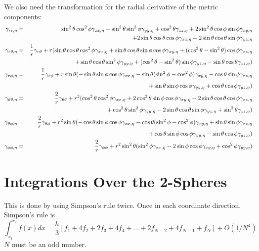 \documentclass{article}
\begin{document}
We also need 
the transformation for the radial derivative of the metric components:
\begin{eqnarray*}
\gamma_{rr,\eta}&=&
\sin^2\theta\cos^2\phi\gamma_{xx,\eta}
+\sin^2\theta\sin^2\phi\gamma_{yy,\eta}
+\cos^2\theta\gamma_{zz,\eta}
+2\sin^2\theta\cos\phi\sin\phi\gamma_{xy,\eta}
\\
&&
+2\sin\theta\cos\theta\cos\phi\gamma_{xz,\eta}
+2\sin\theta\cos\theta\sin\phi\gamma_{yz,\eta}
\\
\gamma_{r\theta,\eta}&=& 
\frac{1}{r}\gamma_{r\theta}+
r(\sin\theta\cos\theta\cos^2\phi\gamma_{xx,\eta}
+\sin\theta\cos\theta\sin\phi\cos\phi\gamma_{xy,\eta}
+(\cos^2\theta-\sin^2\theta)\cos\phi\gamma_{xz,\eta}
\\
&&
+\sin\theta\cos\theta\sin^2\phi\gamma_{yy,\eta}
+(\cos^2\theta-\sin^2\theta)\sin\phi\gamma_{yz,\eta}
-\sin\theta\cos\theta\gamma_{zz,\eta})
\\
\gamma_{r\phi,\eta}&=&
\frac{1}{r}\gamma_{r\phi}+
r\sin\theta(-\sin\theta\sin\phi\cos\phi\gamma_{xx,\eta}
-\sin\theta(\sin^2\phi-\cos^2\phi)\gamma_{xy,\eta}
-\cos\theta\sin\phi\gamma_{xz,\eta}
\\
&&
+\sin\theta\sin\phi\cos\phi\gamma_{yy,\eta}
+\cos\theta\cos\phi\gamma_{yz,\eta})
\\
\gamma_{\theta\theta,\eta}&=&
\frac{2}{r}\gamma_{\theta\theta}+
r^2(\cos^2\theta\cos^2\phi\gamma_{xx,\eta}
+2\cos^2\theta\sin\phi\cos\phi\gamma_{xy,\eta}
-2\sin\theta\cos\theta\cos\phi\gamma_{xz,\eta}
\\
&&
+\cos^2\theta\sin^2\phi\gamma_{yy,\eta}
-2\sin\theta\cos\theta\sin\phi\gamma_{yz,\eta}
+\sin^2\theta\gamma_{zz,\eta})
\\
\gamma_{\theta\phi,\eta}&=&
\frac{2}{r}\gamma_{\theta\phi}+
r^2\sin\theta(-\cos\theta\sin\phi\cos\phi\gamma_{xx,\eta}
-\cos\theta(\sin^2\phi-\cos^2\phi)\gamma_{xy,\eta}
+\sin\theta\sin\phi\gamma_{xz,\eta}
\\
&&
+\cos\theta\sin\phi\cos\phi\gamma_{yy,\eta}
-\sin\theta\cos\phi\gamma_{yz,\eta})
\\
\gamma_{\phi\phi,\eta}&=&
\frac{2}{r}\gamma_{\phi\phi}+
r^2\sin^2\theta(\sin^2\phi\gamma_{xx,\eta}
-2\sin\phi\cos\phi\gamma_{xy,\eta}
+\cos^2\phi\gamma_{yy,\eta})
\end{eqnarray*}

\section{Integrations Over the 2-Spheres}


This is done by using Simpson's rule twice. Once in each coordinate 
direction. Simpson's rule is
\begin{equation}
\int^{x_2}_{x_1} f(x) dx = 
  \frac{h}{3} [f_1+4f_2+2f_3+4f_4+\ldots+2f_{N-2}+4 f_{N-1}+f_N]
  +O(1/N^4)
\end{equation}
$N$ must be an odd number.
\end{document}
